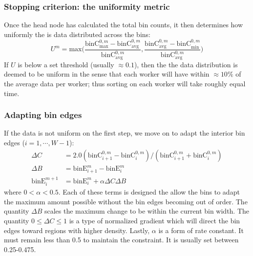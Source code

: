 \documentclass{article}
\begin{document}
\subsubsection{Stopping criterion: the uniformity metric}
Once the head node has calculated the total bin counts, it then determines how uniformly the is data distributed across the bins:
\begin{equation}
	U^m = \textrm{max} \bigg( \dfrac{\textrm{binC}^{0,m}_{\textrm{max}} - \textrm{binC}^{0,m}_{\textrm{avg}}}{\textrm{binC}^{0,m}_{\textrm{avg}}}, \dfrac{\textrm{binC}^{0,m}_{\textrm{avg}} - \textrm{binC}^{0,m}_{\textrm{min}}}{\textrm{binC}^{0,m}_{\textrm{avg}}} \bigg)
\end{equation}
If $U$ is below a set threshold (usually $\approx 0.1$), then the the data distribution is deemed to be uniform in the sense that each worker will have within $\approx 10\%$ of the average data per worker; thus sorting on each worker will take roughly equal time.


\subsubsection{Adapting bin edges}
If the data is not uniform on the first step, we move on to adapt the interior bin edges ($i = 1, \cdots, W-1$):
\begin{equation}
	\begin{split}
		\Delta C & = 2.0 ( \textrm{binC}^{0,m}_{i+1} - \textrm{binC}^{0,m}_i ) / ( \textrm{binC}^{0,m}_{i+1} + \textrm{binC}^{0,m}_i ) \\
		\Delta B & = \textrm{binE}^m_{i+1} - \textrm{binE}^m_i \\
		\textrm{binE}^{m+1}_i & = \textrm{binE}^m_i + \alpha \Delta C \Delta B
	\end{split}
\end{equation}
where $0 < \alpha < 0.5$. Each of these terms is designed the allow the bins to adapt the maximum amount possible without the bin edges becoming out of order. The quantity $\Delta B$ scales the maximum change to be within the current bin width. The quantity $0 \le \Delta C \le 1$ is a type of normalized gradient which will direct the bin edges toward regions with higher density. Lastly, $\alpha$ is a form of rate constant. It must remain less than 0.5 to maintain the constraint. It is usually set between 0.25-0.475.
\end{document}
